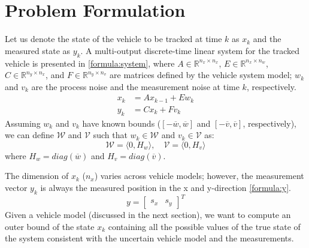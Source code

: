 \section{Problem Formulation}
Let us denote the state of the vehicle to be tracked at time $k$ as $x_k$ and the measured state as $y_k$. A multi-output discrete-time linear system for the tracked vehicle is presented in \eqref{formula:system}, where $A \in \mathbb{R} ^{n_x \times n_x}$, $E \in \mathbb{R} ^{n_x \times n_w}$, $C \in \mathbb{R} ^{n_y \times n_x}$, and $F \in \mathbb{R} ^{n_y \times n_v}$ are matrices defined by the vehicle system model; $w_k$ and $v_k$ are the process noise and the measurement noise at time $k$, respectively. 
\begin{equation}
\label{formula:system}
\begin{split}
x_{k} &= Ax_{k-1} + Ew_k\\
y_k &= Cx_k + Fv_k
\end{split}
\end{equation}
Assuming $w_k$ and $v_k$ have known bounds ($[-\overline{w}, \overline{w}]$ and $[-\overline{v}, \overline{v}]$, respectively), we can define $\mathcal{W}$ and $\mathcal{V}$ such that $w_k \in \mathcal{W}$ and $v_k \in \mathcal{V}$ as:
\begin{equation}
\label{formula:wv}
\mathcal{W} = \langle 0, H_w \rangle ,\quad \mathcal{V} = \langle 0, H_v \rangle
\end{equation}
where $H_w = diag(\overline{w})$ and $H_v= diag(\overline{v})$.


The dimension of $x_k$ ($n_x$) varies across vehicle models; however, the measurement vector $y_k$ is always the measured position in the x and y-direction \eqref{formula:y}.  
\begin{equation}
\label{formula:y}
y =[ 
\begin{matrix}
s_x & s_y
\end{matrix}
]^T
\end{equation}
Given a vehicle model (discussed in the next section), we want to compute an outer bound of the state $x_k$ containing all the possible values of the true state of the system consistent with the uncertain vehicle model and the measurements.
